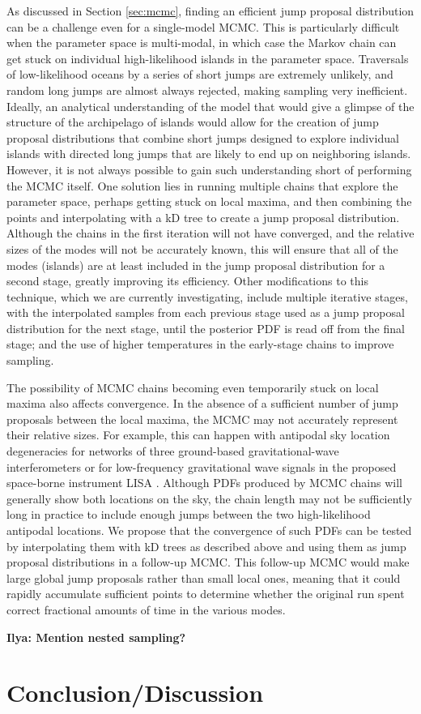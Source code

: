 \documentclass[prd,preprint]{revtex4}
\newcommand{\ilya}[1]{{\color{red} \bf Ilya: #1}}
\begin{document}
As discussed in Section \ref{sec:mcmc}, finding an efficient jump proposal distribution can be a challenge even for a single-model MCMC.  This is particularly difficult when the parameter space is multi-modal, in which case the Markov chain can get stuck on individual high-likelihood islands in the parameter space.  Traversals of low-likelihood oceans by a series of short jumps are extremely unlikely, and random long jumps are almost always rejected, making sampling very inefficient.  Ideally, an analytical understanding of the model that would give a glimpse of the structure of the archipelago of islands would allow for the creation of jump proposal distributions that combine short jumps designed to explore individual islands with directed long jumps that are likely to end up on neighboring islands.  However, it is not always possible to gain such understanding short of performing the MCMC itself.  One solution lies in running multiple chains that explore the parameter space, perhaps getting stuck on local maxima, and then combining the points and interpolating with a kD tree to create a jump proposal distribution.  Although the chains in the first iteration will not have converged, and the relative sizes of the modes will not be accurately known, this will ensure that all of the modes (islands) are at least included in the jump proposal distribution for a second stage, greatly improving its efficiency.  Other modifications to this technique, which we are currently investigating, include multiple iterative stages, with the interpolated samples from each previous stage used as a jump proposal distribution for the next stage, until the posterior PDF is read off from the final stage; and the use of higher temperatures in the early-stage chains to improve sampling.

The possibility of MCMC chains becoming even temporarily stuck on local maxima also affects convergence.   In the absence of a sufficient number of jump proposals between the local maxima, the MCMC may not accurately represent their relative sizes.  For example, this can happen with antipodal sky location degeneracies for networks of three ground-based gravitational-wave interferometers or for low-frequency gravitational wave signals in the proposed space-borne instrument LISA \cite{LISA}.  Although PDFs produced by MCMC chains will generally show both locations on the sky, the chain length may not be sufficiently long in practice to include enough jumps between the two high-likelihood antipodal locations.  We propose that the convergence of such PDFs can be tested by interpolating them with kD trees as described above and using them as jump proposal distributions in a follow-up MCMC.  This follow-up MCMC would make large global jump proposals rather than small local ones, meaning that it could rapidly accumulate sufficient points to determine whether the original run spent correct fractional amounts of time in the various modes.


\ilya{Mention nested sampling?}

\section{Conclusion/Discussion}





\nocite{Littenberg2009}


\end{document}
